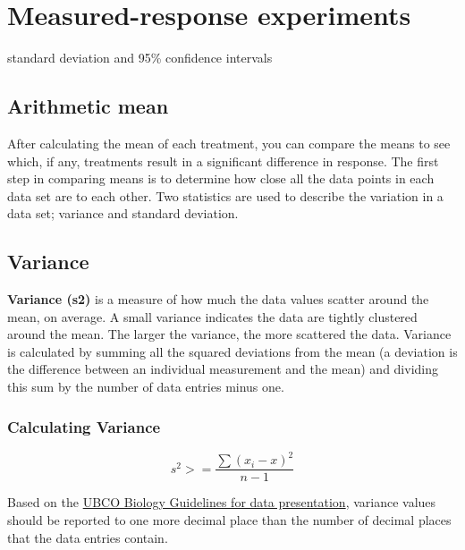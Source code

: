 \documentclass[
]{book}
\begin{document}
\hypertarget{measured-response-experiments}{%
\section*{Measured-response experiments}\label{measured-response-experiments}}

standard deviation and 95\% confidence intervals

\hypertarget{arithmetic-mean}{%
\subsection*{Arithmetic mean}\label{arithmetic-mean}}

After calculating the mean of each treatment, you can compare the means to see which, if any, treatments result in a significant difference in response. The first step in comparing means is to determine how close all the data points in each data set are to each other. Two statistics are used to describe the variation in a data set; variance and standard deviation.

\hypertarget{variance}{%
\subsection*{Variance}\label{variance}}

\textbf{Variance (s2)} is a measure of how much the data values scatter around the mean, on average. A small variance indicates the data are tightly clustered around the mean. The larger the variance, the more scattered the data. Variance is calculated by summing all the squared deviations from the mean (a deviation is the difference between an individual measurement and the mean) and dividing this sum by the number of data entries minus one.

\hypertarget{calculating-variance}{%
\subsubsection*{Calculating Variance}\label{calculating-variance}}

\[s^{2}> =\frac{ \sum{(x_{i}-x)^{2}}}{n-1}\]

Based on the \href{https://pages.learning.github.ubc.ca/vdunbar/Procedural-Documents/biology-guidelines-for-data-presentation.html}{UBCO Biology Guidelines for data presentation}, variance values should be reported to one more decimal place than the number of decimal places that the data entries contain.
\end{document}
